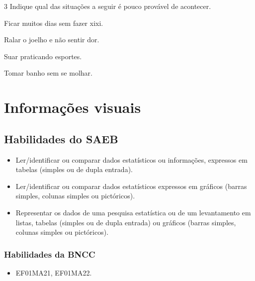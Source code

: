 \num{3} Indique qual das situações a seguir é pouco provável de acontecer.

\begin{escolha}[itemsep=-5pt]
\item Ficar muitos dias sem fazer xixi.

\item Ralar o joelho e não sentir dor.

\item Suar praticando esportes.

\item Tomar banho sem se molhar.
\end{escolha}


\chapter{Informações visuais}


\section*{Habilidades do SAEB}

\begin{itemize}
\item Ler/identificar ou comparar dados estatísticos ou informações, expressos em tabelas (simples ou de dupla entrada).

\item Ler/identificar ou comparar dados estatísticos expressos em gráficos (barras simples, colunas simples ou pictóricos).

\item Representar os dados de uma pesquisa estatística ou de um levantamento
em listas, tabelas (simples ou de dupla entrada) ou gráficos (barras
simples, colunas simples ou pictóricos).
\end{itemize}

\subsection{Habilidades da BNCC}

\begin{itemize}
	\item EF01MA21, EF01MA22.
\end{itemize}

